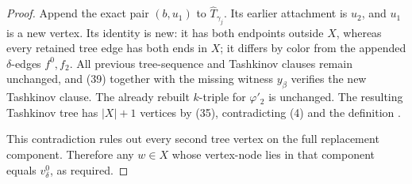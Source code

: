 \begin{proof}
Append the exact pair $(b,u_1)$ to $\widehat T_{\gamma_j}$.  Its earlier
attachment is $u_2$, and $u_1$ is a new vertex.  Its identity is new: it
has both endpoints outside $X$, whereas every retained tree edge has both
ends in $X$; it differs by color from the appended $\delta$-edges
$f^0,f_2$.  All previous tree-sequence and Tashkinov clauses remain
unchanged, and (39) together with the missing witness $y_\beta$ verifies
the new Tashkinov clause.  The already rebuilt $k$-triple for
$\varphi'_2$ is unchanged.  The resulting Tashkinov tree has
$|X|+1$ vertices by (35), contradicting (4) and the definition
.

This contradiction rules out every second tree vertex on the full
replacement component.  Therefore any $w\in X$ whose vertex-node lies in
that component equals $v^0_\delta$, as required.
\end{proof}
